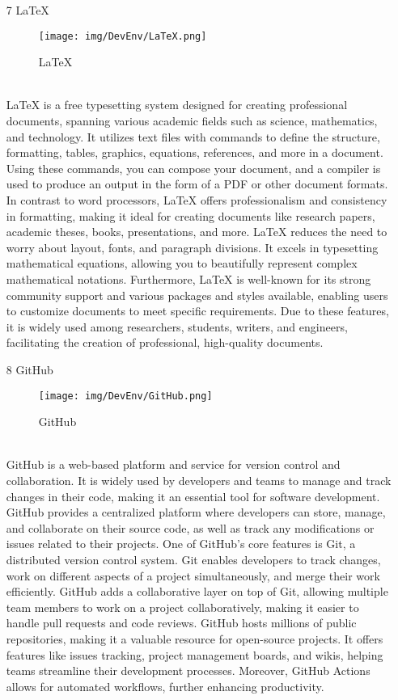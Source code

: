 \documentclass[conference]{IEEEtran}
\begin{document}
\begin{enumerate}
\item[7] LaTeX
\begin{figure}[h]
\centering
\texttt{[image: img/DevEnv/LaTeX.png]}
\caption{LaTeX} 
\end{figure}\\
LaTeX is a free typesetting system designed for creating professional documents, spanning various academic fields such as science, mathematics, and technology. It utilizes text files with commands to define the structure, formatting, tables, graphics, equations, references, and more in a document. Using these commands, you can compose your document, and a compiler is used to produce an output in the form of a PDF or other document formats.
In contrast to word processors, LaTeX offers professionalism and consistency in formatting, making it ideal for creating documents like research papers, academic theses, books, presentations, and more. LaTeX reduces the need to worry about layout, fonts, and paragraph divisions. It excels in typesetting mathematical equations, allowing you to beautifully represent complex mathematical notations.
Furthermore, LaTeX is well-known for its strong community support and various packages and styles available, enabling users to customize documents to meet specific requirements. Due to these features, it is widely used among researchers, students, writers, and engineers, facilitating the creation of professional, high-quality documents.\\

\item[8] GitHub
\begin{figure}[h]
\centering
\texttt{[image: img/DevEnv/GitHub.png]}
\caption{GitHub} 
\end{figure}\\
GitHub is a web-based platform and service for version control and collaboration. It is widely used by developers and teams to manage and track changes in their code, making it an essential tool for software development. GitHub provides a centralized platform where developers can store, manage, and collaborate on their source code, as well as track any modifications or issues related to their projects.
One of GitHub's core features is Git, a distributed version control system. Git enables developers to track changes, work on different aspects of a project simultaneously, and merge their work efficiently. GitHub adds a collaborative layer on top of Git, allowing multiple team members to work on a project collaboratively, making it easier to handle pull requests and code reviews.
GitHub hosts millions of public repositories, making it a valuable resource for open-source projects. It offers features like issues tracking, project management boards, and wikis, helping teams streamline their development processes. Moreover, GitHub Actions allows for automated workflows, further enhancing productivity.\\
\clearpage


\end{enumerate}
\end{document}
